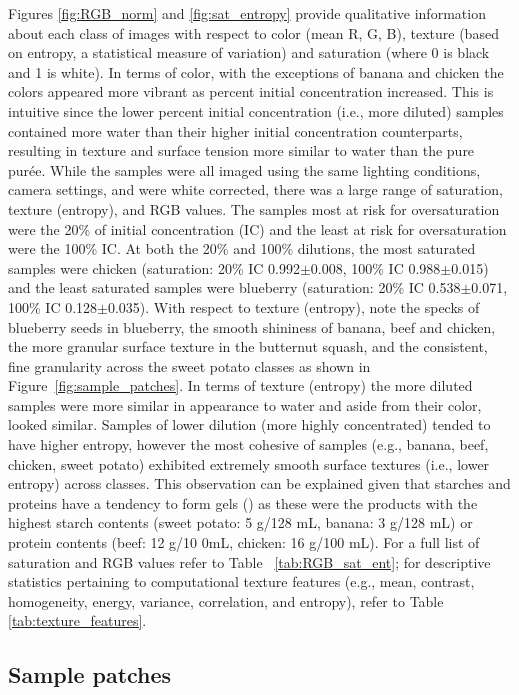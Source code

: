 \documentclass[authoryear]{elsarticle}
\begin{document}
Figures \ref{fig:RGB_norm} and \ref{fig:sat_entropy} provide qualitative information about each class of images with respect to color (mean R, G, B), texture (based on entropy, a statistical measure of variation) and saturation (where 0 is black and 1 is white). In terms of color, with the exceptions of banana and chicken the colors appeared more vibrant as percent initial concentration increased. This is intuitive since the lower percent initial concentration (i.e., more diluted) samples contained more water than their higher initial concentration counterparts, resulting in texture and surface tension more similar to water than the pure pur\' ee. While the samples were all imaged using the same lighting conditions, camera settings, and were white corrected, there was a large range of saturation, texture (entropy), and RGB values. The samples most at risk for oversaturation were the 20\% of initial concentration (IC) and the least at risk for oversaturation were the 100\% IC. At both the 20\% and 100\% dilutions, the most saturated samples were chicken (saturation: 20\% IC 0.992$\pm$0.008, 100\% IC 0.988$\pm$0.015) and the least saturated samples were blueberry (saturation: 20\% IC 0.538$\pm$0.071, 100\% IC 0.128$\pm$0.035). With respect to texture (entropy), note the specks of blueberry seeds in blueberry, the smooth shininess of banana, beef and chicken, the more granular surface texture in the butternut squash, and the consistent, fine granularity across the sweet potato classes as shown in Figure~\ref{fig:sample_patches}. In terms of texture (entropy) the more diluted samples were more similar in appearance to water and aside from their color, looked similar. Samples of lower dilution (more highly concentrated) tended to have higher entropy, however the most cohesive of samples (e.g., banana, beef, chicken, sweet potato) exhibited extremely smooth surface textures (i.e., lower entropy) across classes. This observation can be explained given that starches and proteins have a tendency to form gels (\cite{alvarez2013}) as these were the products with the highest starch contents (sweet potato: 5 g/128 mL, banana: 3 g/128 mL) or protein contents (beef: 12 g/10 0mL, chicken: 16 g/100 mL). For a full list of saturation and RGB values refer to Table~ \ref{tab:RGB_sat_ent}; for descriptive statistics pertaining to computational texture features (e.g., mean, contrast, homogeneity, energy, variance, correlation, and entropy), refer to Table~ \ref{tab:texture_features}.

\subsection{Sample patches}\label{ssec:sample patches}
\end{document}
